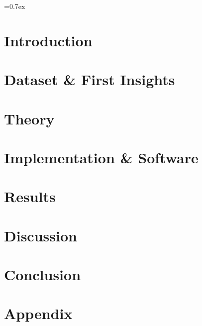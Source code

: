 


	
	\font=0.7ex%

	
	\thispagestyle{empty}
	\tableofcontents
	\thispagestyle{empty}
	
	\pagestyle{fancy}
	\fancyhf{}
	\cfoot{\thepage}
	
	\newpage	
	\section{Introduction}
	
	
	\section{Dataset \& First Insights}\label{sec:dataset}
	
	
	\section{Theory}\label{sec:theory}
	
	
	\section{Implementation \& Software}					\label{sec:implementation_software}
	
	
	\section{Results}\label{sec:results}
	
	
	\newpage
	\section{Discussion}\label{sec:discussion}
	
	
	\section{Conclusion}\label{sec:conclusion}
	

	\newpage
	\printbibliography
	
	\newpage
	\section*{Appendix}\label{sec:appendix}
	
	
